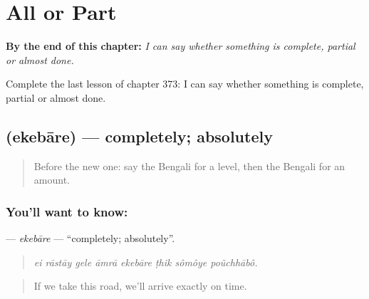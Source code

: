 
\chapter{All or Part}
\label{ch:bn-all-or-part}

\begin{chapteropening}
\textbf{By the end of this chapter:} \emph{I can say whether something is complete, partial or almost done.}

Complete the last lesson of chapter 373: I can say whether something is complete, partial or almost done.
\end{chapteropening}

\section[\texorpdfstring{\bn{একেবারে} (ekebāre)}{একেবারে (ekebāre)}]{ (ekebāre) — completely; absolutely}

\label{lesson:BN-C373-ekebare}



\begin{quote}
Before the new one: say the Bengali for a level, then the Bengali for an amount.
\end{quote}

\subsection*{You'll want to know: }
\textbf{} — \emph{ekebāre} — \textquotedblleft{}completely; absolutely\textquotedblright{}.

\begin{quote}
       
\end{quote}

\begin{quote}
\emph{ei rāstāy gele āmrā ekebāre ṭhik sômôye poũchhābô.}
\end{quote}

\begin{quote}
If we take this road, we'll arrive exactly on time.
\end{quote}

